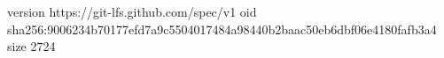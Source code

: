version https://git-lfs.github.com/spec/v1
oid sha256:9006234b70177efd7a9c5504017484a98440b2baac50eb6dbf06e4180fafb3a4
size 2724
